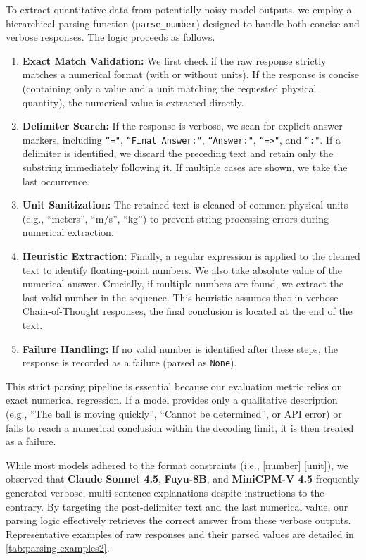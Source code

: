 To extract quantitative data from potentially noisy model outputs, we employ a hierarchical parsing function (\texttt{parse\_number}) designed to handle both concise and verbose responses. The logic proceeds as follows.

\begin{enumerate}
    \item \textbf{Exact Match Validation:} We first check if the raw response strictly matches a numerical format (with or without units). If the response is concise (containing only a value and a unit matching the requested physical quantity), the numerical value is extracted directly.
    
    \item \textbf{Delimiter Search:} If the response is verbose, we scan for explicit answer markers, including \texttt{``="}, \texttt{``Final Answer:"}, \texttt{``Answer:"}, \texttt{``=>"}, and \texttt{``:"}. If a delimiter is identified, we discard the preceding text and retain only the substring immediately following it. If multiple cases are shown, we take the last occurrence. 
    
    \item \textbf{Unit Sanitization:} The retained text is cleaned of common physical units (e.g., ``meters'', ``m/s'', ``kg'') to prevent string processing errors during numerical extraction.
    
    \item \textbf{Heuristic Extraction:} Finally, a regular expression is applied to the cleaned text to identify floating-point numbers. We also take absolute value of the numerical answer. Crucially, if multiple numbers are found, we extract the {last} valid number in the sequence. This heuristic assumes that in verbose Chain-of-Thought responses, the final conclusion is located at the end of the text.
    
    \item \textbf{Failure Handling:} If no valid number is identified after these steps, the response is recorded as a failure (parsed as \texttt{None}).
\end{enumerate}

This strict parsing pipeline is essential because our evaluation metric relies on exact numerical regression. If a model provides only a qualitative description (e.g., ``The ball is moving quickly'', ``Cannot be determined'', or API error) or fails to reach a numerical conclusion within the decoding limit, it is then treated as a failure.

While most models adhered to the format constraints (i.e., [number] [unit]), we observed that \textbf{Claude Sonnet 4.5}, \textbf{Fuyu-8B}, and \textbf{MiniCPM-V 4.5} frequently generated verbose, multi-sentence explanations despite instructions to the contrary. By targeting the post-delimiter text and the last numerical value, our parsing logic effectively retrieves the correct answer from these verbose outputs. Representative examples of raw responses and their parsed values are detailed in \autoref{tab:parsing-examples2}.





